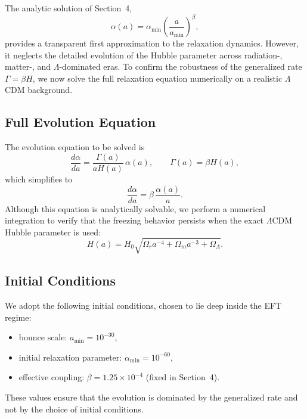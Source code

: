 \documentclass[11pt,a4paper]{article}
\begin{document}
The analytic solution of Section~4,
\begin{equation}
    \alpha(a)
    = \alpha_{\min}
      \left(\frac{a}{a_{\min}}\right)^{\beta},
\end{equation}
provides a transparent first approximation to the relaxation dynamics. However, it neglects the
detailed evolution of the Hubble parameter across radiation-, matter-, and $\Lambda$-dominated
eras. To confirm the robustness of the generalized rate $\Gamma = \beta H$, we now solve the full
relaxation equation numerically on a realistic $\Lambda$CDM background.

\subsection{Full Evolution Equation}

The evolution equation to be solved is
\begin{equation}
    \frac{d\alpha}{da}
    = \frac{\Gamma(a)}{aH(a)}\,\alpha(a),
    \qquad
    \Gamma(a) = \beta H(a),
\end{equation}
which simplifies to
\begin{equation}
    \frac{d\alpha}{da}
    = \beta\,\frac{\alpha(a)}{a}.
\end{equation}
Although this equation is analytically solvable, we perform a numerical integration to verify
that the freezing behavior persists when the exact $\Lambda$CDM Hubble parameter is used:
\begin{equation}
    H(a)
    = H_0\sqrt{\Omega_r a^{-4} + \Omega_m a^{-3} + \Omega_\Lambda}.
\end{equation}

\subsection{Initial Conditions}

We adopt the following initial conditions, chosen to lie deep inside the EFT regime:
\begin{itemize}
    \item bounce scale: $a_{\min} = 10^{-30}$,
    \item initial relaxation parameter: $\alpha_{\min} = 10^{-60}$,
    \item effective coupling: $\beta = 1.25\times 10^{-4}$ (fixed in Section~4).
\end{itemize}
These values ensure that the evolution is dominated by the generalized rate and not by the
choice of initial conditions.
\end{document}
